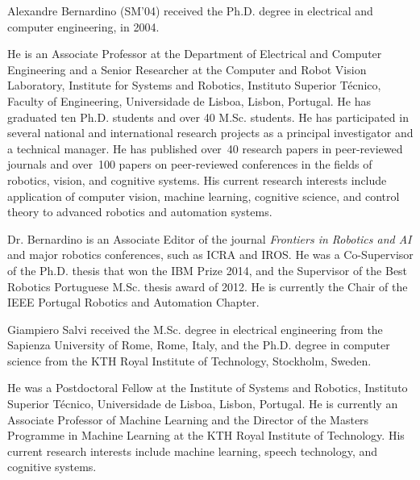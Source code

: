 \begin{IEEEbiography}{Alexandre Bernardino}
  (SM'04)
  received the Ph.D. degree in electrical and computer engineering, in 2004.

  He is an Associate Professor at the Department of Electrical and Computer Engineering and a Senior Researcher at the Computer and Robot Vision Laboratory, Institute for Systems and Robotics, Instituto Superior Técnico, Faculty of Engineering, Universidade de Lisboa, Lisbon, Portugal.
  He has graduated ten Ph.D. students and over 40 M.Sc. students.
  He has participated in several national and international research projects as a principal investigator and a technical manager.
  He has published over~40 research papers in peer-reviewed journals and over~100 papers on peer-reviewed conferences in the fields of robotics, vision, and cognitive systems.
  His current research interests include application of computer vision, machine learning, cognitive science, and control theory to advanced robotics and automation systems.

  Dr. Bernardino is an Associate Editor of the journal \emph{Frontiers in Robotics and AI} and major robotics conferences, such as ICRA and IROS.
  He was a Co-Supervisor of the Ph.D. thesis that won the IBM Prize 2014, and the Supervisor of the Best Robotics Portuguese M.Sc. thesis award of 2012.
  He is currently the Chair of the IEEE Portugal Robotics and Automation Chapter.
\end{IEEEbiography}

\begin{IEEEbiography}{Giampiero Salvi}
  received the M.Sc. degree in electrical engineering from the Sapienza University of Rome, Rome, Italy, and the Ph.D. degree in computer science from the KTH Royal Institute of Technology, Stockholm, Sweden.

  He was a Postdoctoral Fellow at the Institute of Systems and Robotics, Instituto Superior Técnico, Universidade de Lisboa, Lisbon, Portugal.
  He is currently an Associate Professor of Machine Learning and the Director of the Masters Programme in Machine Learning at the KTH Royal Institute of Technology.
  His current research interests include machine learning, speech technology, and cognitive systems.
\end{IEEEbiography}
